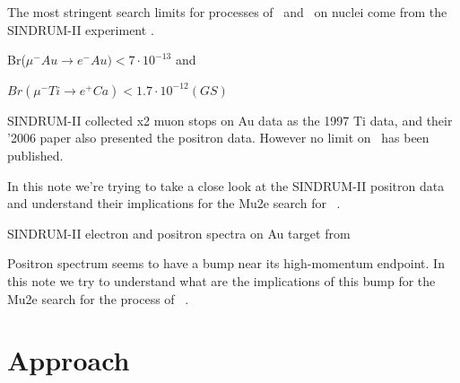 \documentclass[12pt]{article}
\begin{document}
The most stringent search limits for processes of \mumemconv\ and \mumepconv\
on nuclei come from the SINDRUM-II experiment \cite{sindrum_ii_Bertl2006}.

Br($\mu^- Au \rightarrow e^- Au) < 7·10^{-13}$ and

$Br(\mu^- Ti \rightarrow e^+ Ca) < 1.7·10^{-12}(GS)$

SINDRUM-II collected x2 muon stops on Au data as the 1997 Ti data,
and their '2006 paper also presented the positron data.
However no limit on \mumepconv\ has been published.

In this note we're trying to take a close look at the SINDRUM-II positron data
and understand their implications for the Mu2e search for \mumepconv\ .

\vspace{0.2in}
 {
  SINDRUM-II electron and positron spectra on Au target from 
}

Positron spectrum seems to have a bump near its high-momentum endpoint.
In this note we try to understand what are the implications of this bump
for the Mu2e search for the process of \mumepconv\ .


\newpage
\section { Approach}
\end{document}
